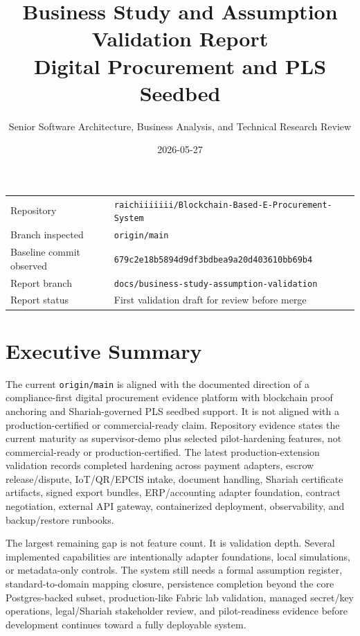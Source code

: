 \documentclass[11pt,a4paper]{article}
\title{Business Study and Assumption Validation Report\\\large Digital Procurement and PLS Seedbed}
\author{Senior Software Architecture, Business Analysis, and Technical Research Review}
\date{2026-05-27}
\newcommand{\repo}[1]{\texttt{#1}}
\begin{document}
\maketitle

\begin{center}
\begin{tabular}{ll}
Repository & \repo{raichiiiiiii/Blockchain-Based-E-Procurement-System} \\
Branch inspected & \repo{origin/main} \\
Baseline commit observed & \repo{679c2e18b5894d9df3bdbea9a20d403610bb69b4} \\
Report branch & \repo{docs/business-study-assumption-validation} \\
Report status & First validation draft for review before merge \\
\end{tabular}
\end{center}

\section*{Executive Summary}

The current \repo{origin/main} is aligned with the documented direction of a compliance-first digital procurement evidence platform with blockchain proof anchoring and Shariah-governed PLS seedbed support. It is not aligned with a production-certified or commercial-ready claim. Repository evidence states the current maturity as supervisor-demo plus selected pilot-hardening features, not commercial-ready or production-certified. The latest production-extension validation records completed hardening across payment adapters, escrow release/dispute, IoT/QR/EPCIS intake, document handling, Shariah certificate artifacts, signed export bundles, ERP/accounting adapter foundation, contract negotiation, external API gateway, containerized deployment, observability, and backup/restore runbooks.

The largest remaining gap is not feature count. It is validation depth. Several implemented capabilities are intentionally adapter foundations, local simulations, or metadata-only controls. The system still needs a formal assumption register, standard-to-domain mapping closure, persistence completion beyond the core Postgres-backed subset, production-like Fabric lab validation, managed secret/key operations, legal/Shariah stakeholder review, and pilot-readiness evidence before development continues toward a fully deployable system.
\end{document}
